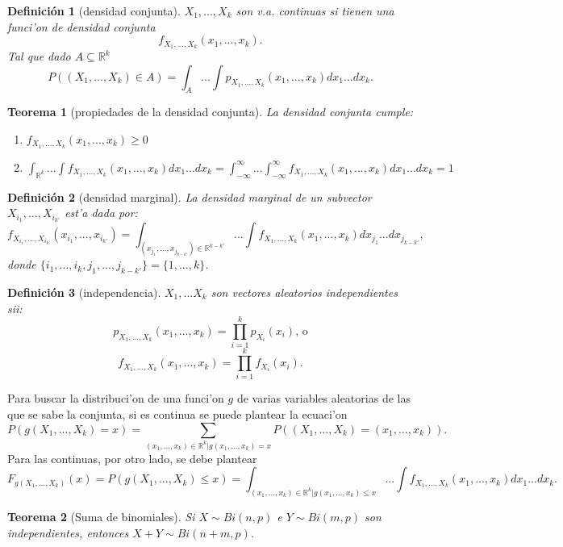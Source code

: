 \documentclass[a4paper,spanish]{article}
\newcommand{\R}[0]{\mathbb{R}}
\newtheorem{teo}{Teorema}
\newtheorem{defi}{Definici\'on}
\begin{document}
\begin{defi}[densidad conjunta]
$X_1,...,X_k$ son v.a. continuas si tienen una \emph{funci'on de
densidad conjunta} 
$$f_{X_1,...,X_k}(x_1,...,x_k).$$
Tal que dado $A \subseteq \R^k$ 
$$P((X_1,...,X_k) \in A) = 
	\int_A...\int p_{X_1,...,X_k}(x_1,...,x_k) dx_1...dx_k.$$
\end{defi}

\begin{teo}[propiedades de la densidad conjunta]
La densidad conjunta cumple:
\begin{enumerate}
\item $f_{X_1,...,X_k}(x_1,...,x_k) \geq 0$
\item $\int_{\R^k}...\int f_{X_1,...,X_k}(x_1,...,x_k) dx_1...dx_k = 
	\int_{-\infty}^\infty...\int_{-\infty}^\infty f_{X_1,...,X_k}(x_1,...,x_k) 
		dx_1...dx_k = 1$
\end{enumerate}
\end{teo}

\begin{defi}[densidad marginal]
La \emph{densidad marginal} de un subvector $X_{i_1},...,X_{i_{k'}}$ est'a dada
por:
$$f_{X_{i_1},...,X_{i_{k'}}}(x_{i_1},...,x_{i_{k'}}) = 
	\int_{(x_{j_1},...,x_{j_{k-k'}}) \in \R^{k-k'}}...\int
		f_{X_1,...,X_k}(x_1,...,x_k) dx_{j_1}...dx_{j_{k-k'}},$$
donde $\{i_1,...,i_k,j_1,...,j_{k-k'}\} = \{1,...,k\}$.
\end{defi}

\begin{defi}[independencia]
$X_1,...X_k$ son vectores aleatorios independientes sii:
$$p_{X_1,...,X_k}(x_1,...,x_k) = \prod_{i=1}^k p_{X_i}(x_i)\mbox{, o}$$
$$f_{X_1,...,X_k}(x_1,...,x_k) = \prod_{i=1}^k f_{X_i}(x_i).$$
\end{defi}

Para buscar la distribuci'on de una funci'on $g$ de varias variables aleatorias
de las que se sabe la conjunta, si es continua se puede plantear la ecuaci'on
$$P(g(X_1,...,X_k) = x) = 
	\sum_{(x_1,...,x_k) \in \R^k | g(x_1,...,x_k) = x}
		P((X_1,...,X_k) = (x_1,...,x_k)).$$
Para las continuas, por otro lado, se debe plantear
$$F_{g(X_1,...,X_k)}(x) = P(g(X_1,...,X_k) \leq x) = 
	\int_{(x_1,...,x_k) \in \R^k | g(x_1,...,x_k) \leq x} ... \int
		f_{X_1,...,X_k}(x_1,...,x_k) dx_1...dx_k.$$

\begin{teo}[Suma de binomiales]
Si $X \sim Bi(n,p)$ e $Y \sim Bi(m,p)$ son independientes, entonces 
$X+Y \sim Bi(n+m,p)$.
\end{teo}
\end{document}

